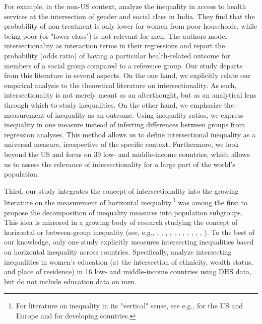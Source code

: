 For example, in the non-US context, \cite{Sen2009} analyze the inequality in access to health services at the intersection of gender and social class in India. They find that the probability of non-treatment is only lower for women from poor households, while being poor (or "lower class") is not relevant for men. The authors model intersectionality as interaction terms in their regressions and report the probability (odds ratio) of having a particular health-related outcome for members of a social group compared to a reference group. Our study departs from this literature in several aspects. On the one hand, we explicitly relate our empirical analysis to the theoretical literature on intersectionality. As such, intersectionality is not merely meant as an afterthought, but as an analytical lens through which to study inequalities. On the other hand, we emphasize the measurement of inequality as an outcome. Using inequality ratios, we express inequality in one measure instead of inferring differences between groups from regression analyses. This method allows us to define intersectional inequality as a universal measure, irrespective of the specific context. Furthermore, we look beyond the US and focus on 39 low- and middle-income countries, which allows us to assess the relevance of intersectionality for a large part of the world's population.

Third, our study integrates the concept of intersectionality into the growing literature on the measurement of horizontal inequality.\footnote{For literature on inequality in its "vertical" sense, see e.g., \cite{Piketty2014} for the US and Europe and \cite{Ravallion2014} for developing countries.} \cite{Shorrocks1984} was among the first to propose the decomposition of inequality measures into population subgroups. This idea is mirrored in a growing body of research studying the concept of horizontal or between-group inequality (see, e.g., \cite{Langer2005}, \cite{Langer2007}, \cite{Mancini2008}, \cite{Mancini2008a}, \cite{Stewart2009}, \cite{Elbers2008}, \cite{Cederman2011}, \cite{Cederman2015}, \cite{Canelas2018}, \cite{Leivas2018}, \cite{McDoom2019}, \cite{Tetteh-Baah2019}). To the best of our knowledge, only one study explicitly measures intersecting inequalities based on horizontal inequality across countries. Specifically, \cite{Lenhardt2015} analyze intersecting inequalities in women's education (at the intersection of ethnicity, wealth status, and place of residence) in 16 low- and middle-income countries using DHS data, but do not include education data on men.


